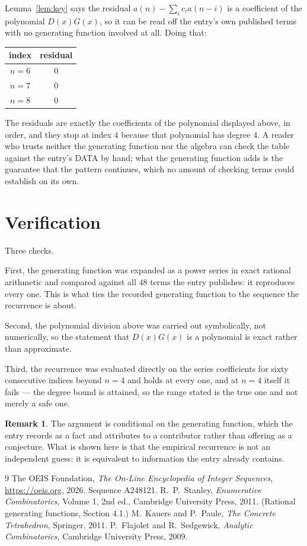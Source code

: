 \documentclass[11pt,a4paper]{article}
\theoremstyle{plain}
\theoremstyle{definition}
\newtheorem{remark}[theorem]{Remark}
\begin{document}
Lemma~\ref{lem:key} says the residual $a(n)-\sum_ic_ia(n-i)$ is a coefficient of the
polynomial $D(x)G(x)$, so it can be read off the entry's own published terms with no
generating function involved at all. Doing that:
\begin{center}
\begin{tabular}{cc}
index & residual \\ \hline
$n=6$ & $0$ \\
$n=7$ & $0$ \\
$n=8$ & $0$
\end{tabular}
\end{center}
The residuals are exactly the coefficients of the polynomial displayed above, in order, and
they stop at index $4$ because that polynomial has degree $4$. A reader who trusts
neither the generating function nor the algebra can check the table against the entry's DATA
by hand; what the generating function adds is the guarantee that the pattern continues, which
no amount of checking terms could establish on its own.

\section{Verification}

Three checks.

First, the generating function was expanded as a power series in exact rational arithmetic and
compared against all $48$ terms the entry publishes: it reproduces every one. This is
what ties the recorded generating function to the sequence the recurrence is about.

Second, the polynomial division above was carried out symbolically, not numerically, so the
statement that $D(x)G(x)$ is a polynomial is exact rather than approximate.

Third, the recurrence was evaluated directly on the series coefficients for sixty consecutive
indices beyond $n=4$ and holds at every one, and at $n=4$ itself it fails --- the
degree bound is attained, so the range stated is the true one and not merely a safe one.

\begin{remark}
The argument is conditional on the generating function, which the entry records as a fact and
attributes to a contributor rather than offering as a conjecture. What is shown here is that
the empirical recurrence is not an independent guess: it is equivalent to information the
entry already contains.
\end{remark}

\begin{thebibliography}{9}
 The OEIS Foundation, \emph{The On-Line Encyclopedia of Integer
Sequences}, \url{https://oeis.org}, 2026. Sequence A248121.
 R.~P.~Stanley, \emph{Enumerative Combinatorics}, Volume 1, 2nd ed.,
Cambridge University Press, 2011. (Rational generating functions, Section 4.1.)
 M.~Kauers and P.~Paule, \emph{The Concrete Tetrahedron}, Springer, 2011.
 P.~Flajolet and R.~Sedgewick, \emph{Analytic Combinatorics}, Cambridge
University Press, 2009.
\end{thebibliography}
\end{document}
